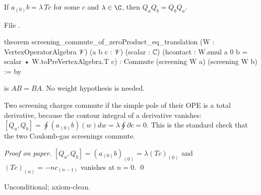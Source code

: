 \begin{theorem}\label{l04:thm:scrcommute}
If $a_{(0)}b = \lambda\,Tc$ for some $c$ and $\lambda\in\C$, then $Q_aQ_b = Q_bQ_a$.
\end{theorem}
\noindent File .
\begin{leancode}
theorem screening_commute_of_zeroProduct_eq_translation
    (W : VertexOperatorAlgebra 𝒱) (a b c : 𝒱) (scalar : ℂ)
    (hcontact : W.smul a 0 b = scalar • W.toPreVertexAlgebra.T c) :
    Commute (screening W a) (screening W b) := by
\end{leancode}
\begin{dictionary}
 is $AB = BA$. No weight hypothesis is needed.
\end{dictionary}
\begin{physics}
Two screening charges commute if the simple pole of their OPE is a total derivative, because the
contour integral of a derivative vanishes: $[Q_a,Q_b] = \oint(a_{(0)}b)(w)dw = \lambda\oint\partial c = 0$.
This is the standard check that the two Coulomb-gas screenings commute.
\end{physics}
\emph{Proof on paper.} $[Q_a,Q_b] = (a_{(0)}b)_{(0)} = \lambda (Tc)_{(0)}$ and $(Tc)_{(n)} = -nc_{(n-1)}$
vanishes at $n = 0$. \qed
\begin{status}
Unconditional; axiom-clean.
\end{status}

